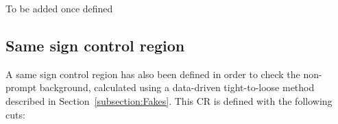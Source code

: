 \documentclass[a4paper, 10pt, openright]{report}
\begin{document}
\color{red}To be added once defined \color{black}

%
%
%

\subsection{Same sign control region} \label{section:SSCR}

A same sign control region has also been defined in order to check the non-prompt background, calculated using a data-driven tight-to-loose method described in Section~\ref{subsection:Fakes}. This \ac{CR} is defined with the following cuts:
\end{document}
